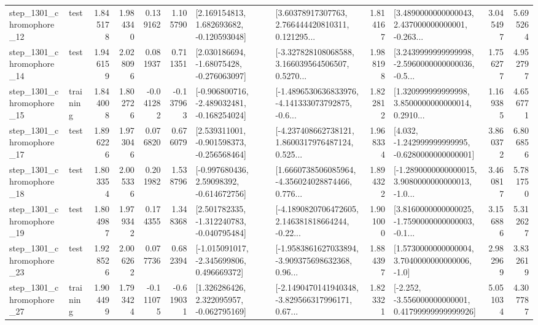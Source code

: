 \begin{tabular}{llrrrrllrlrr}
 step\_1301\_chromophore\_12 &      test &      1.845178 &    1.984340 &      0.139162 &  1.105790 &    [2.169154813, 1.682693682, -0.120593048] &  [3.60378917307763, 2.766444420810311, 0.121295... &       1.814167 &  [3.4890000000000043, 2.437000000000001, -0.263... &            3.045497 &          5.695264 \\
 step\_1301\_chromophore\_14 &      test &      1.946159 &    2.028096 &      0.081937 &  0.711351 &    [2.030186694, -1.68075428, -0.276063097] &  [-3.327828108068588, 3.166039564506507, 0.5270... &       1.988198 &  [3.2439999999999998, -2.5960000000000036, -0.5... &            1.756277 &          4.952797 \\
 step\_1301\_chromophore\_15 &  training &      1.844008 &    1.802726 &     -0.041282 & -0.137963 &  [-0.906800716, -2.489032481, -0.168254024] &  [-1.4896530636833976, -4.141333073792875, -0.6... &       1.822812 &  [1.320999999999998, 3.8500000000000014, 0.2910... &            1.169385 &          4.656771 \\
 step\_1301\_chromophore\_17 &      test &      1.896226 &    1.973046 &      0.076820 &  0.676079 &   [2.539311001, -0.901598373, -0.256568464] &  [-4.237408662738121, 1.8600317976487124, 0.525... &       1.968334 &   [4.032, -1.242999999999995, -0.6280000000000001] &            3.860372 &          6.806856 \\
 step\_1301\_chromophore\_18 &      test &      1.803354 &    2.005336 &      0.201982 &  1.538796 &    [-0.997680436, 2.59098392, -0.614672756] &  [1.6660738506085964, -4.356024028874466, 0.776... &       1.894322 &  [-1.2890000000000015, 3.9080000000000013, -1.0... &            3.460817 &          5.781750 \\
 step\_1301\_chromophore\_19 &      test &      1.804987 &    1.979342 &      0.174355 &  1.348368 &   [2.501782335, -1.312240783, -0.040795484] &  [-4.1890820706472605, 2.146381818664244, -0.22... &       1.901000 &  [3.8160000000000025, -1.7590000000000003, -0.1... &            3.156886 &          5.312627 \\
 step\_1301\_chromophore\_23 &      test &      1.928526 &    2.006262 &      0.077736 &  0.682394 &   [-1.015091017, -2.345699806, 0.496669372] &  [-1.9583861627033894, -3.909375698632368, 0.96... &       1.884397 &     [1.5730000000000004, 3.7040000000000006, -1.0] &            2.982969 &          3.832619 \\
 step\_1301\_chromophore\_27 &  training &      1.904499 &    1.793424 &     -0.111075 & -0.619031 &    [1.326286426, 2.322095957, -0.062795169] &  [-2.1490470141940348, -3.829566317996171, 0.67... &       1.823321 &  [-2.252, -3.556000000000001, 0.41799999999999926] &            5.051034 &          4.307787 \\

\end{tabular}
